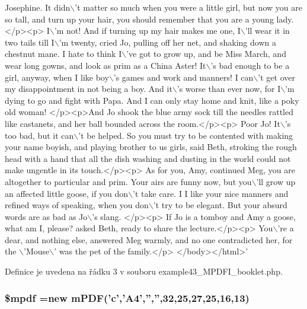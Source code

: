 \begin{DoxyCode}
{       Josephine. It didn\(\backslash\)'t matter so much when you were a little girl, but now you are so tall, and turn up your hair, you
       should remember that you are a young lady. </p><p> I\(\backslash\)'m not!  And if turning up my hair makes me one, I\(\backslash\)'ll
       wear it in two tails till I\(\backslash\)'m twenty,  cried Jo, pulling off her net, and shaking down a chestnut mane.  
       I hate to think I\(\backslash\)'ve got to grow up, and be Miss March, and wear long gowns, and look as prim as a China
       Aster! It\(\backslash\)'s bad enough to be a girl, anyway, when I like boy\(\backslash\)'s games and work and manners! I can\(\backslash\)'t get over
       my disappointment in not being a boy. And it\(\backslash\)'s worse than ever now, for I\(\backslash\)'m dying to go and fight with
       Papa. And I can only stay home and knit, like a poky old woman! </p><p>And Jo shook the blue army sock till
       the needles rattled like castanets, and her ball bounded across the room.</p><p> Poor Jo! It\(\backslash\)'s too bad, but
       it can\(\backslash\)'t be helped. So you must try to be contented with making your name boyish, and playing brother to us
       girls,  said Beth, stroking the rough head with a hand that all the dish washing and dusting in the world
       could not make ungentle in its touch.</p><p> As for you, Amy,  continued Meg,  you are altogether to
       particular and prim. Your airs are funny now, but you\(\backslash\)'ll grow up an affected little goose, if you don\(\backslash\)'t take care.
       I I like your nice manners and refined ways of speaking, when you don\(\backslash\)'t try to be elegant. But your absurd
       words are as bad as Jo\(\backslash\)'s slang. </p><p> If Jo is a tomboy and Amy a goose, what am I, please?  asked Beth,
       ready to share the lecture.</p><p> You\(\backslash\)'re a dear, and nothing else,  answered Meg warmly, and no one
       contradicted her, for the \(\backslash\)'Mouse\(\backslash\)' was the pet of the family.</p>}
\textcolor{stringliteral}{}
\textcolor{stringliteral}{</body></html>'}
\end{DoxyCode}


Definice je uvedena na řádku 3 v souboru example43\-\_\-\-M\-P\-D\-F\-I\-\_\-booklet.\-php.

\hypertarget{example43___m_p_d_f_i__booklet_8php_ad028f81910d6cbab9b184d2214b3a8f8}{
\subsubsection[{\$mpdf}]{\setlength{\rightskip}{0pt plus 5cm}\$mpdf =new {\bf m\-P\-D\-F}('c','A4','','',32,25,27,25,16,13)}}\label{example43___m_p_d_f_i__booklet_8php_ad028f81910d6cbab9b184d2214b3a8f8}


